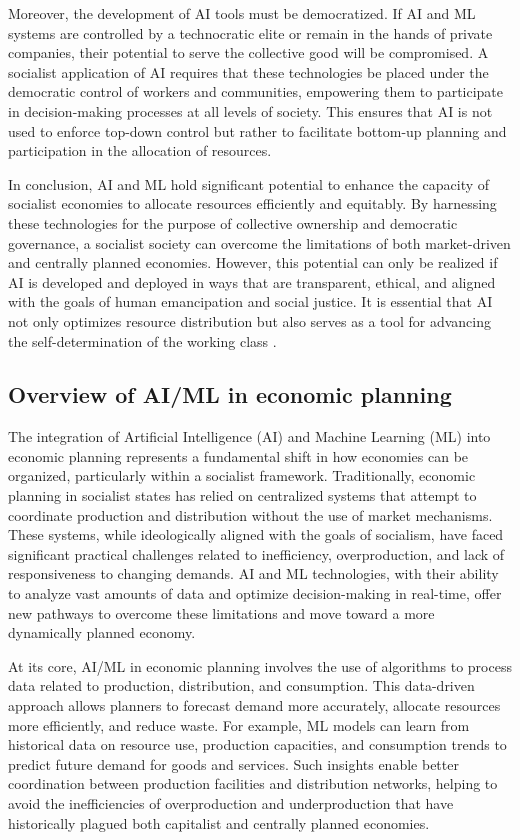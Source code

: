 \begin{refsection}
Moreover, the development of AI tools must be democratized. If AI and ML systems are controlled by a technocratic elite or remain in the hands of private companies, their potential to serve the collective good will be compromised. A socialist application of AI requires that these technologies be placed under the democratic control of workers and communities, empowering them to participate in decision-making processes at all levels of society. This ensures that AI is not used to enforce top-down control but rather to facilitate bottom-up planning and participation in the allocation of resources.

In conclusion, AI and ML hold significant potential to enhance the capacity of socialist economies to allocate resources efficiently and equitably. By harnessing these technologies for the purpose of collective ownership and democratic governance, a socialist society can overcome the limitations of both market-driven and centrally planned economies. However, this potential can only be realized if AI is developed and deployed in ways that are transparent, ethical, and aligned with the goals of human emancipation and social justice. It is essential that AI not only optimizes resource distribution but also serves as a tool for advancing the self-determination of the working class \cite[pp.~45-48]{tapscott2016}.

\subsection{Overview of AI/ML in economic planning}

The integration of Artificial Intelligence (AI) and Machine Learning (ML) into economic planning represents a fundamental shift in how economies can be organized, particularly within a socialist framework. Traditionally, economic planning in socialist states has relied on centralized systems that attempt to coordinate production and distribution without the use of market mechanisms. These systems, while ideologically aligned with the goals of socialism, have faced significant practical challenges related to inefficiency, overproduction, and lack of responsiveness to changing demands. AI and ML technologies, with their ability to analyze vast amounts of data and optimize decision-making in real-time, offer new pathways to overcome these limitations and move toward a more dynamically planned economy.

At its core, AI/ML in economic planning involves the use of algorithms to process data related to production, distribution, and consumption. This data-driven approach allows planners to forecast demand more accurately, allocate resources more efficiently, and reduce waste. For example, ML models can learn from historical data on resource use, production capacities, and consumption trends to predict future demand for goods and services. Such insights enable better coordination between production facilities and distribution networks, helping to avoid the inefficiencies of overproduction and underproduction that have historically plagued both capitalist and centrally planned economies.


\end{refsection}
